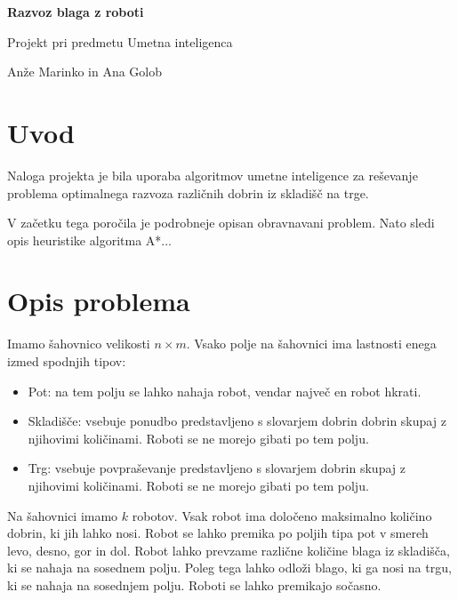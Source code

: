 \documentclass[a4paper,12pt]{article} %
\begin{document}
\begin{center}
\begin{Large}
\textbf{Razvoz blaga z roboti}\\
\end{Large}
\begin{large}
Projekt pri predmetu Umetna inteligenca\\
\vspace{3mm}
\end{large}
Anže Marinko in  Ana Golob
\end{center}

\section{Uvod}
Naloga projekta je bila uporaba algoritmov umetne inteligence za reševanje problema optimalnega razvoza različnih dobrin iz skladišč na trge. 



V začetku tega poročila je podrobneje opisan obravnavani problem. Nato sledi opis heuristike algoritma A*...



\section{Opis problema}



Imamo šahovnico velikosti $n \times m$. Vsako polje na šahovnici ima lastnosti enega izmed spodnjih tipov:

\begin{itemize}

\item Pot: na tem polju se lahko nahaja robot, vendar največ en robot hkrati.

\item Skladišče: vsebuje ponudbo predstavljeno s slovarjem dobrin dobrin skupaj z njihovimi količinami. Roboti se ne morejo gibati po tem polju.

\item Trg: vsebuje povpraševanje predstavljeno s slovarjem dobrin skupaj z njihovimi količinami. Roboti se ne morejo gibati po tem polju.

\end{itemize}

Na šahovnici imamo $k$ robotov. Vsak robot ima določeno maksimalno količino dobrin, ki jih lahko nosi. Robot se lahko premika po poljih tipa pot v smereh levo, desno, gor in dol. Robot lahko prevzame različne količine blaga iz skladišča, ki se nahaja na sosednem polju. Poleg tega lahko odloži blago, ki ga nosi na trgu, ki se nahaja na sosednjem polju. Roboti se lahko premikajo sočasno.\vspace{3mm}
\end{document}
